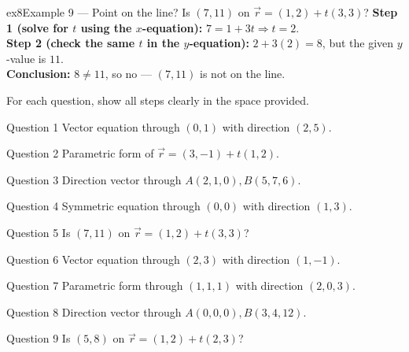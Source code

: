 \documentclass[11pt]{article}
\begin{document}
\begin{example}{ex8}{Example 9 --- Point on the line?}
Is $(7,11)$ on $\vec r=(1,2)+t(3,3)$?\soln
\textbf{Step 1 (solve for $t$ using the $x$-equation):} $7=1+3t\Rightarrow t=2$.\\[3pt]
\textbf{Step 2 (check the same $t$ in the $y$-equation):} $2+3(2)=8$, but the given $y$-value is $11$.\\[3pt]
\textbf{Conclusion:} $8\ne11$, so no --- $(7,11)$ is not on the line.
\end{example}

\clearpage
{}
For each question, show all steps clearly in the space provided.

\begin{qbox}{Question 1}
Vector equation through $(0,1)$ with direction $(2,5)$.\workspace{2.4cm}
\end{qbox}

\begin{qbox}{Question 2}
Parametric form of $\vec r=(3,-1)+t(1,2)$.\workspace{2.4cm}
\end{qbox}

\begin{qbox}{Question 3}
Direction vector through $A(2,1,0),B(5,7,6)$.\workspace{2.4cm}
\end{qbox}

\begin{qbox}{Question 4}
Symmetric equation through $(0,0)$ with direction $(1,3)$.\workspace{2.4cm}
\end{qbox}

\begin{qbox}{Question 5}
Is $(7,11)$ on $\vec r=(1,2)+t(3,3)$?\workspace{2.4cm}
\end{qbox}

\begin{qbox}{Question 6}
Vector equation through $(2,3)$ with direction $(1,-1)$.\workspace{2.4cm}
\end{qbox}

\begin{qbox}{Question 7}
Parametric form through $(1,1,1)$ with direction $(2,0,3)$.\workspace{2.4cm}
\end{qbox}

\begin{qbox}{Question 8}
Direction vector through $A(0,0,0),B(3,4,12)$.\workspace{2.4cm}
\end{qbox}

\begin{qbox}{Question 9}
Is $(5,8)$ on $\vec r=(1,2)+t(2,3)$?\workspace{2.4cm}
\end{qbox}
\end{document}
